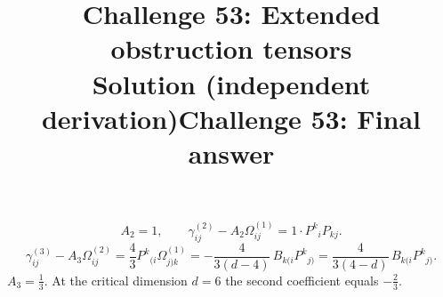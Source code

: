 \documentclass[11pt]{article}
\title{Challenge 53: Extended obstruction tensors \\ \large Solution (independent derivation)}
\date{}
\title{Challenge 53: Final answer}
\author{}
\begin{document}
\maketitle
\begin{equation}
A_2=1,\qquad \gamma^{(2)}_{ij}-A_2\Omega^{(1)}_{ij}=1\cdot P^k{}_iP_{kj}.
\end{equation}
\begin{equation}
\gamma^{(3)}_{ij}-A_3\Omega^{(2)}_{ij}=\frac{4}{3}P^k{}_{(i}\Omega^{(1)}_{j)k}=-\frac{4}{3(d-4)}\,B_{k(i}P^k{}_{j)}=\frac{4}{3(4-d)}\,B_{k(i}P^k{}_{j)} .
\end{equation}
$A_3=\frac13$. At the critical dimension $d=6$ the second coefficient equals $-\frac23$.
\end{document}

